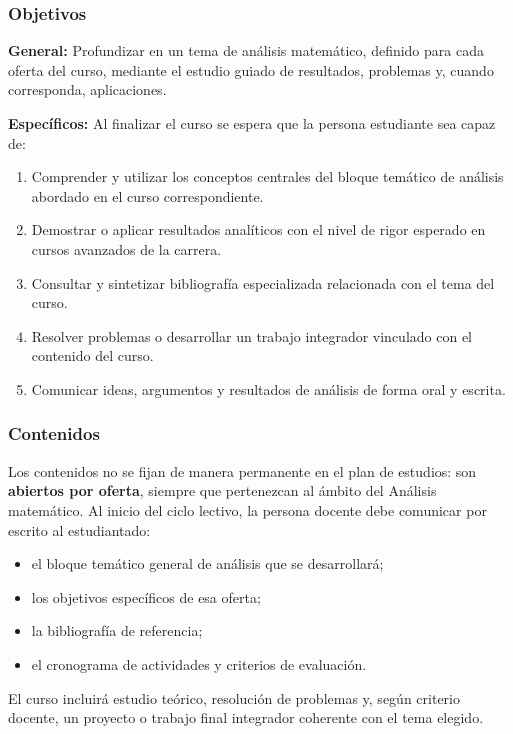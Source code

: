 \begin{refsection}
\subsubsection*{Objetivos}

\textbf{General:} Profundizar en un tema de análisis matemático, definido para cada oferta del curso, mediante el estudio guiado de resultados, problemas y, cuando corresponda, aplicaciones.

\textbf{Específicos:} Al finalizar el curso se espera que la persona estudiante sea capaz de:

\begin{enumerate}
\item Comprender y utilizar los conceptos centrales del bloque temático de análisis abordado en el curso correspondiente.
\item Demostrar o aplicar resultados analíticos con el nivel de rigor esperado en cursos avanzados de la carrera.
\item Consultar y sintetizar bibliografía especializada relacionada con el tema del curso.
\item Resolver problemas o desarrollar un trabajo integrador vinculado con el contenido del curso.
\item Comunicar ideas, argumentos y resultados de análisis de forma oral y escrita.
\end{enumerate}

\subsubsection*{Contenidos}

Los contenidos no se fijan de manera permanente en el plan de estudios: son \textbf{abiertos por oferta}, siempre que pertenezcan al ámbito del Análisis matemático. Al inicio del ciclo lectivo, la persona docente debe comunicar por escrito al estudiantado:

\begin{itemize}
\item el bloque temático general de análisis que se desarrollará;
\item los objetivos específicos de esa oferta;
\item la bibliografía de referencia;
\item el cronograma de actividades y criterios de evaluación.
\end{itemize}

El curso incluirá estudio teórico, resolución de problemas y, según criterio docente, un proyecto o trabajo final integrador coherente con el tema elegido.


\end{refsection}
